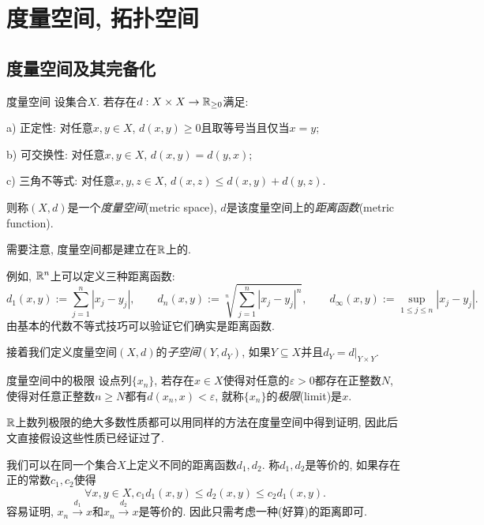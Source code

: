 \newpage
\section{度量空间, 拓扑空间} 

\subsection{度量空间及其完备化}

\begin{definition}{度量空间}
	设集合$X$. 若存在$d:X \times X \to \mathbb{R} _{\geq 0}$满足: 
	
	a) 正定性: 对任意$x,y \in X$, $d(x,y)\geq 0$且取等号当且仅当$x=y$; 
	
	b) 可交换性: 对任意$x,y \in X$, $d(x,y)=d(y,x)$; 
	
	c) 三角不等式: 对任意$x,y,z \in X$, $d(x,z) \leq d(x,y)+d(y,z)$. 
	
	\noindent
	则称$(X,d)$是一个\textit{度量空间}(metric space), $d$是该度量空间上的\textit{距离函数}(metric function). 
\end{definition}
\begin{remark}
	需要注意, 度量空间都是建立在$\mathbb{R}$上的. 
\end{remark}

例如, $\mathbb{R} ^n$上可以定义三种距离函数: $$d_1(x,y) := \sum_{j=1}^n |x_j-y_j|,\qquad d_n(x,y) := \sqrt[n]{\sum_{j=1}^n |x_j-y_j|^n},\qquad d_{\infty}(x,y) := \sup_{1 \leq j \leq n}|x_j-y_j|. $$
由基本的代数不等式技巧可以验证它们确实是距离函数. 

接着我们定义度量空间$(X,d)$的\textit{子空间}$(Y,d_Y)$, 如果$Y \subseteq X$并且$d_Y = d|_{Y \times Y}$. 

\begin{definition}{度量空间中的极限}
	设点列$\{ x_n \}$, 若存在$x \in X$使得对任意的$\varepsilon >0$都存在正整数$N$, 使得对任意正整数$n\geq N$都有$d(x_n,x)<\varepsilon$, 就称$\{ x_n \}$的\textit{极限}(limit)是$x$. 
\end{definition}
\begin{remark}
	$\mathbb{R}$上数列极限的绝大多数性质都可以用同样的方法在度量空间中得到证明, 因此后文直接假设这些性质已经证过了. 
\end{remark}

我们可以在同一个集合$X$上定义不同的距离函数$d_1,d_2$. 称$d_1,d_2$是等价的, 如果存在正的常数$c_1,c_2$使得$$\forall x,y \in X, c_1d_1(x,y) \leq d_2(x,y) \leq c_2d_1(x,y).$$
容易证明, $x_n \stackrel{d_1}{\longrightarrow} x$和$x_n \stackrel{d_2}{\longrightarrow} x$是等价的. 因此只需考虑一种(好算)的距离即可. 

